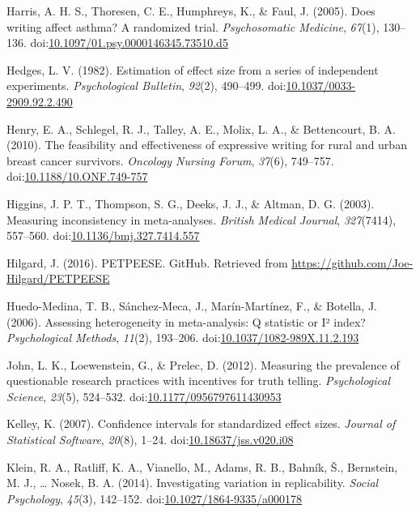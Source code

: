 \documentclass[man, mask]{apa6}
\theoremstyle{definition}
\theoremstyle{definition}
\theoremstyle{definition}
\theoremstyle{remark}
\begin{document}
\hypertarget{ref-Harris2005}{}
Harris, A. H. S., Thoresen, C. E., Humphreys, K., \& Faul, J. (2005).
Does writing affect asthma? A randomized trial. \emph{Psychosomatic
Medicine}, \emph{67}(1), 130--136.
doi:\href{https://doi.org/10.1097/01.psy.0000146345.73510.d5}{10.1097/01.psy.0000146345.73510.d5}

\hypertarget{ref-Hedges1982}{}
Hedges, L. V. (1982). Estimation of effect size from a series of
independent experiments. \emph{Psychological Bulletin}, \emph{92}(2),
490--499.
doi:\href{https://doi.org/10.1037/0033-2909.92.2.490}{10.1037/0033-2909.92.2.490}

\hypertarget{ref-Henry2010}{}
Henry, E. A., Schlegel, R. J., Talley, A. E., Molix, L. A., \&
Bettencourt, B. A. (2010). The feasibility and effectiveness of
expressive writing for rural and urban breast cancer survivors.
\emph{Oncology Nursing Forum}, \emph{37}(6), 749--757.
doi:\href{https://doi.org/10.1188/10.ONF.749-757}{10.1188/10.ONF.749-757}

\hypertarget{ref-Higgins2003}{}
Higgins, J. P. T., Thompson, S. G., Deeks, J. J., \& Altman, D. G.
(2003). Measuring inconsistency in meta-analyses. \emph{British Medical
Journal}, \emph{327}(7414), 557--560.
doi:\href{https://doi.org/10.1136/bmj.327.7414.557}{10.1136/bmj.327.7414.557}

\hypertarget{ref-Hilgard2016}{}
Hilgard, J. (2016). PETPEESE. GitHub. Retrieved from
\url{https://github.com/Joe-Hilgard/PETPEESE}

\hypertarget{ref-Huedo-Medina2006}{}
Huedo-Medina, T. B., Sánchez-Meca, J., Marín-Martínez, F., \& Botella,
J. (2006). Assessing heterogeneity in meta-analysis: Q statistic or I²
index? \emph{Psychological Methods}, \emph{11}(2), 193--206.
doi:\href{https://doi.org/10.1037/1082-989X.11.2.193}{10.1037/1082-989X.11.2.193}

\hypertarget{ref-John2012}{}
John, L. K., Loewenstein, G., \& Prelec, D. (2012). Measuring the
prevalence of questionable research practices with incentives for truth
telling. \emph{Psychological Science}, \emph{23}(5), 524--532.
doi:\href{https://doi.org/10.1177/0956797611430953}{10.1177/0956797611430953}

\hypertarget{ref-Kelley2007}{}
Kelley, K. (2007). Confidence intervals for standardized effect sizes.
\emph{Journal of Statistical Software}, \emph{20}(8), 1--24.
doi:\href{https://doi.org/10.18637/jss.v020.i08}{10.18637/jss.v020.i08}

\hypertarget{ref-Klein2014a}{}
Klein, R. A., Ratliff, K. A., Vianello, M., Adams, R. B., Bahník, Š.,
Bernstein, M. J., \ldots{} Nosek, B. A. (2014). Investigating variation
in replicability. \emph{Social Psychology}, \emph{45}(3), 142--152.
doi:\href{https://doi.org/10.1027/1864-9335/a000178}{10.1027/1864-9335/a000178}
\end{document}

